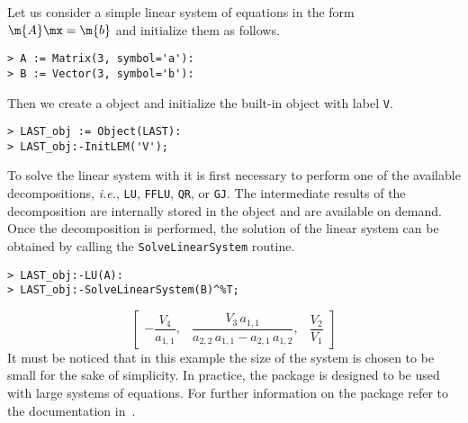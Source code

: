 Let us consider a simple linear system of equations in the form $\m{A}\mx = \m{b}$ and initialize them as follows.
%
\begin{verbatim}
> A := Matrix(3, symbol='a'):
> B := Vector(3, symbol='b'):
\end{verbatim}
%
Then we create a \LAST{} object and initialize the built-in \LEM{} object with label \texttt{V}.
%
\begin{verbatim}
> LAST_obj := Object(LAST):
> LAST_obj:-InitLEM('V');
\end{verbatim}
%
To solve the linear system with \LAST{} it is first necessary to perform one of the available decompositions, \emph{i.e.}, \texttt{LU}, \texttt{FFLU}, \texttt{QR}, or \texttt{GJ}. The intermediate results of the decomposition are internally stored in the \LAST{} object and are available on demand. Once the decomposition is performed, the solution of the linear system can be obtained by calling the \texttt{SolveLinearSystem} routine.
%
\begin{verbatim}
> LAST_obj:-LU(A):
> LAST_obj:-SolveLinearSystem(B)^%T;
\end{verbatim}
\begin{equation*}
    \begin{bmatrix}
        -\dfrac{V_{4}}{a_{1,1}}, &
        \dfrac{V_{3} \, a_{1,1}}{a_{2,2} \, a_{1,1}-a_{2,1} \, a_{1,2}}, &
        \dfrac{V_{2}}{V_{1}}
    \end{bmatrix}
\end{equation*}
%
It must be noticed that in this example the size of the system is chosen to be small for the sake of simplicity. In practice, the \LAST{} package is designed to be used with large systems of equations. For further information on the \LAST{} package refer to the documentation in~\cite{last2023source}.
